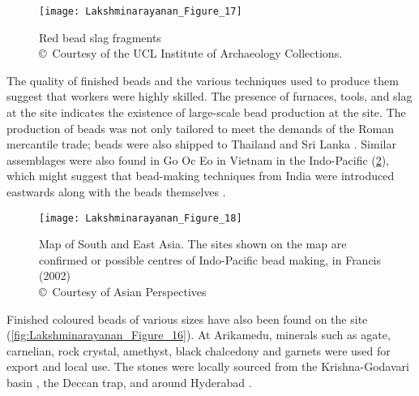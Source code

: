 \begin{figure}[!htb]
	\texttt{[image: Lakshminarayanan\_Figure\_17]}
	\caption{Red bead slag fragments\\
		{\normalfont\scriptsize\copyright\ Courtesy of the UCL Institute of Archaeology Collections.
	}}
	\label{fig:Lakshminarayanan_Figure_17}
\end{figure}

The quality of finished beads and the various techniques used to produce them suggest that workers were highly skilled. The presence of furnaces, tools, and slag at the site indicates the existence of large-scale bead production at the site. The production of beads was not only tailored to meet the demands of the Roman mercantile trade; beads were also shipped to Thailand and Sri Lanka \parencite[][4-5]{francis1990}. Similar assemblages were also found in Go Oc Eo in Vietnam in the Indo-Pacific (\cref{fig:Lakshminarayanan_Figure_18}), which might suggest that bead-making techniques from India were introduced eastwards along with the beads themselves \parencite[][17]{francis1990}.

\begin{figure}[!htb]
	\texttt{[image: Lakshminarayanan\_Figure\_18]}
	\caption{Map of South and East Asia. The sites shown on the map are confirmed or possible centres of Indo-Pacific bead making, in Francis (2002)\\
		{\normalfont\scriptsize\copyright\ Courtesy of Asian Perspectives
	}}
	\label{fig:Lakshminarayanan_Figure_18}
\end{figure}

Finished coloured beads of various sizes have also been found on the site (\cref{fig:Lakshminarayanan_Figure_16}). At Arikamedu, minerals such as agate, carnelian, rock crystal, amethyst, black chalcedony and garnets were used for export and local use. The stones were locally sourced from the Krishna-Godavari basin \parencite[][37]{newbold1844}, the Deccan trap, and around Hyderabad \parencite[][535]{sinkankas1996}.

